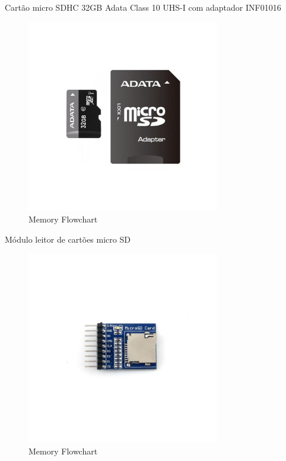 Cartão micro SDHC 32GB Adata Class 10 UHS-I com adaptador
INF01016

\begin{figure}[H]
    \centering
    \includegraphics[width=0.75\textwidth]{images/chapter/design/components/sdcard.png}  %
    \caption{Memory Flowchart}
    \label{fig:Memory Flowchart}        
\end{figure}

Módulo leitor de cartões micro SD

\begin{figure}[H]
    \centering
    \includegraphics[width=0.75\textwidth]{images/chapter/design/components/sd_support.jpg}  %
    \caption{Memory Flowchart}
    \label{fig:Memory Flowchart}        
\end{figure}

